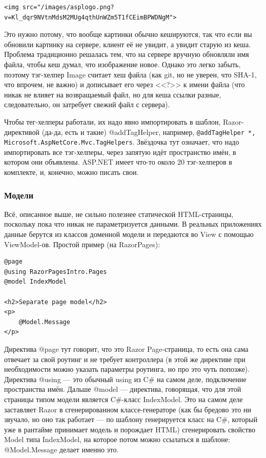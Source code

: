 \documentclass[a5paper]{article}
\begin{document}
\begin{verbatim}
<img src="/images/asplogo.png?v=Kl_dqr9NVtnMdsM2MUg4qthUnWZm5T1fCEimBPWDNgM">
\end{verbatim}

Это нужно потому, что вообще картинки обычно кешируются, так что если вы обновили картинку на сервере, клиент её не увидит, а увидит старую из кеша. Проблема традиционно решалась тем, что на сервере вручную обновляли имя файла, чтобы кеш думал, что изображение новое. Однако это легко забыть, поэтому тэг-хелпер Image считает хеш файла (как git, но не уверен, что SHA-1, что впрочем, не важно) и дописывает его через <<?>> к имени файла (что никак не влияет на возвращаемый файл, но для кеша ссылки разные, следовательно, он затребует свежий файл с сервера).

Чтобы тег-хелперы работали, их надо явно импортировать в шаблон, Razor-директивой (да-да, есть и такие) @addTagHelper, например, \texttt{@addTagHelper *, Microsoft.AspNetCore.Mvc.TagHelpers}. Звёздочка тут означает, что надо импортировать все тэг-хелперы, через запятую идёт пространство имён, в котором они объявлены. ASP.NET имеет что-то около 20 тэг-хелперов в комплекте, и, конечно, можно писать свои.

\subsubsection{Модели}

Всё, описанное выше, не сильно полезнее статической HTML-страницы, поскольку пока что никак не параметризуется данными. В реальных приложениях данные берутся из классов доменной модели и передаются во View с помощью ViewModel-ов. Простой пример (на RazorPages):

\begin{verbatim}
@page
@using RazorPagesIntro.Pages
@model IndexModel

<h2>Separate page model</h2>
<p>
    @Model.Message
</p>
\end{verbatim}

Директива @page тут говорит, что это Razor Page-страница, то есть она сама отвечает за свой роутинг и не требует контроллера (в этой же директиве при необходимости можно указать параметры роутинга, но про это чуть попозже). Директива @using --- это обычный using из C\# на самом деле, подключение пространства имён. Дальше @model --- директива, говорящая, что для этой страницы типом модели является C\#-класс IndexModel. Это на самом деле заставляет Razor в сгенерированном классе-генераторе (как бы бредово это ни звучало, но оно так работает --- по шаблону генерируется класс на C\#, который уже в рантайме принимает модель и порождает HTML) сгенерировать свойство Model типа IndexModel, на которое потом можно ссылаться в шаблоне: @Model.Message делает именно это.
\end{document}

